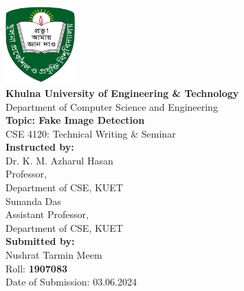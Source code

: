 \documentclass[a4paper,14pt]{report}
\begin{document}
\begin{titlepage}
    \begin{center}
        \includegraphics[width=0.2\textwidth]{Images/logo.png}\\[1cm]
        \Large
        \textbf{Khulna University of Engineering \& Technology}\\
        Department of Computer Science and Engineering\\
        \vspace{1cm}
        \textbf{Topic: Fake Image Detection} \\           
        CSE 4120: Technical Writing \& Seminar\\
        \vspace{1cm}    
        \textbf{Instructed by:}\\
        Dr. K. M. Azharul Hasan\\
        Professor,\\ Department of CSE, KUET\\
        Sunanda Das\\
        Assistant Professor,\\ Department of CSE, KUET\\
        \vspace{1cm}
        \textbf{Submitted by:}\\
        Nushrat Tarmin Meem\\
        Roll: \textbf{1907083}\\
        Date of Submission: 03.06.2024 
    \end{center}
\end{titlepage}

\tableofcontents
\newpage
\listoftables
\newpage
\listoffigures
\newpage

\end{document}

